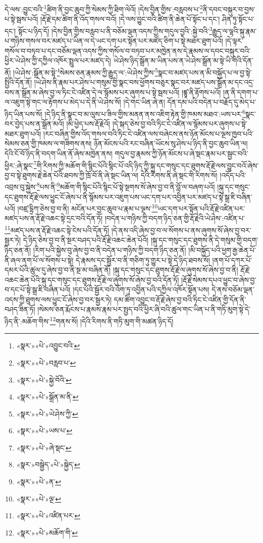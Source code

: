 དེ་ལས་:བྱུང་བའི་\footnote{«སྣར་»«པེ་»འབྱུང་བའི་}ཚིག་ནི་བྱང་ཆུབ་ཀྱི་སེམས་ཀྱི་ཐིག་ལེའོ། །དེས་བྱིན་གྱིས་:བརླབས་པ་\footnote{«སྣར་»«པེ་»བརླབ་པ་}ནི་དབང་བསྐུར་བ་བྱས་པ་སྟེ་སྦས་པའོ། །རྡོ་རྗེ་དམ་ཚིག་ནི་འོད་གསལ་བའོ། །དེ་ལས་བྱུང་བའི་ཚིག་ནི་ཆེན་པོ་སྟོང་པ་དང་། ཤིན་ཏུ་སྟོང་པ་དང་། སྟོང་པ་ཉིད་དོ། །དེས་བྱིན་གྱིས་བརླབ་པ་ནི་བཅོམ་ལྡན་འདས་ཀྱིས་གདུལ་བྱའི་:སྐྱེ་བའི་\footnote{«སྣར་»«པེ་»སྐྱེ་བོའི་}རྒྱུད་ལ་ལྷའི་སྐུ་རྣམ་པ་གཉིས་གསལ་བར་མཛད་པ་ཡིན་ལ་དེ་ཡང་དག་པར་སྟོན་པར་མཛོད་ཅིག་པ་སྟེ་མཐར་ཐུག་པའོ། །དེ་ལྟར་གསོལ་བ་བཏབ་པ་དང་བཅོམ་ལྡན་འདས་ཀྱིས་གསོལ་བ་བཏབ་པར་མཁྱེན་ནས་དེ་རྣམས་ལ་དབང་བསྐུར་བའི་ཕྱིར་ཡེ་ཤེས་ཀྱི་དཀྱིལ་འཁོར་སྤྲུལ་པར་མཛད་དེ། ཡེ་ཤེས་ཉིད་སྒྲོན་མ་ཡིན་པས་ན་ཡེ་ཤེས་སྒྲོན་མ་སྟེ་ཡི་གེའི་དོན་ནོ། །ཡེ་ཤེས་:སྒྲོན་མ་སྟེ་\footnote{«སྣར་»«པེ་»སྒྲོན་མ་ནི་}སེམས་ཅན་རྣམས་ཀྱི་རྒྱུད་ལ་:ཡེ་ཤེས་ཀྱིས་\footnote{«སྣར་»«པེ་»ཡེ་ཤེས་ཀྱི་}སྣང་བ་མཛད་པས་ན་མི་བསྐྱོད་པ་ལ་བྱ་སྟེ་སྤྱིའི་དོན་ནོ། །ཡེ་ཤེས་ནི་རྣམ་པར་ཤེས་པ་གསུམ་གྱི་སྣང་བས་ཕྱོགས་བཅུར་སྣང་བར་མཛད་པས་སྒྲོན་མ་དང་འདྲ་བས་ན་སྒྲོན་མ་ཞེས་བྱ་ལ་ཏིང་ངེ་འཛིན་དེ་ལ་སྙོམས་པར་ཞུགས་པ་སྟེ་སྦས་པའོ། །ཛྙཱ་ནི་རྟོགས་པའོ། །ན་ནི་དགག་པ་ལ་འཇུག་སྟེ་གང་ལ་རྟོགས་པ་མེད་པ་དེ་ནི་ཡེ་ཤེས་སོ། །དེ་གང་ཡིན་ཞེ་ན། དོན་དམ་པའི་བདེན་པ་བརྗོད་དུ་མེད་པ་ཉིད་ཡིན་པས་སོ། །དེ་ཉིད་ནི་སྣང་བ་མ་ལུས་པ་ཟིལ་གྱིས་མནན་ནས་འཇིག་རྟེན་གྱི་ཁམས་མཐའ་:ཡས་པར་\footnote{«སྣར་»«པེ་»ཡས་པ་}སྣང་བར་བྱེད་པས་ན་སྒྲོན་མའོ། །མི་ཕྱེད་པས་རྡོ་རྗེའོ། །དེ་སྐད་ཅེས་བྱ་བའི་ཏིང་ངེ་འཛིན་ལ་སྙོམས་པར་ཞུགས་པ་སྟེ་མཐར་ཐུག་པའོ། །རང་བཞིན་གྱིས་འོད་གསལ་བའི་ཏིང་ངེ་འཛིན་ལས་བཞེངས་ནས་ཉོན་མོངས་པ་ལྔས་ཁྱབ་པའི་སེམས་ཅན་གྱི་ཁམས་ལ་གཟིགས་ནས། ཉོན་མོངས་པའི་རང་བཞིན་ཡོངས་སུ་ཤེས་པ་ཉིད་ནི་བྱང་ཆུབ་ཡིན་ལ། དེའི་ངོ་བོ་ཉིད་ནི་བདག་ཡིན་ནོ་ཞེས་མཁྱེན་ནས། གདུལ་བྱ་རྣམས་ཀྱི་ཉོན་མོངས་པ་ཞེ་སྡང་རྣམ་པར་སྦྱང་བའི་ཕྱིར་:ཞེ་སྣང་\footnote{«སྣར་»«པེ་»ཞེ་སྡང་}གི་རིགས་ཀྱི་མཆོག་གི་སྙིང་པོའི་སྙིང་པོ་འདི་ཉིད་ཀྱི་སྐུ་དང་གསུང་དང་ཐུགས་རྡོ་རྗེ་ལས་བྱུང་བའོ་ཞེས་བྱ་བ་སྟེ་ཐུགས་རྗེ་ཆེན་པོའི་ཐབས་ཀྱི་ཁྲོ་བོ་ནི་ཞེ་སྡང་ཡིན་ལ། དེའི་རིགས་ནི་ཞེ་སྡང་གི་རིགས་སོ། །འདོད་པའི་འབྲས་བུ་སྐྱེས་\footnote{«སྣར་»བསྒྱེད་«པེ་»སྐྱེད་}པས་ནི་\footnote{«སྣར་»«པེ་»ན་}མཆོག་གི་སྙིང་པོའི་སྙིང་པོ་སྟེ་སྔགས་སོ་ཞེས་བྱ་བ་ནི་བློ་ལ་བཞག་པའོ། །སྐུ་དང་གསུང་དང་ཐུགས་རྡོ་རྗེ་ལས་ཕྱུང་ངོ་ཞེས་པ་ནི་སྙོམས་པར་འཇུག་པས་ཡང་དག་པར་འབྱིན་པར་མཛད་པ་སྟེ་སྒྲ་ཇི་བཞིན་པའོ། །བཛྲ་དྷྲིཀ་ཅེས་བྱ་བ་ནི། མངོན་པར་བྱང་ཆུབ་པ་རྣམ་པ་ལྔས་\footnote{«སྣར་»«པེ་»ལྔ་}ཡང་དག་པར་སྟོན་པའི་རྡོ་རྗེ་འཛིན་པར་མཛད་པས་ན་རྡོ་རྗེ་འཆང་སྟེ་དྲང་བའི་དོན་ཏོ། །བདེན་པ་གཉིས་ཀྱི་བདག་ཉིད་ཅན་གྱི་རྡོ་རྗེའི་ཡེ་ཤེས་:འཛིན་པ་\footnote{«སྣར་»«པེ་»འཛིན་པར་}མཛད་པས་ན་རྡོ་རྗེ་འཆང་སྟེ་ངེས་པའི་དོན་ཏོ། །དེ་ནས་འདི་ཞེས་བྱ་བ་ལ་སོགས་པ་ནས་ཞུགས་སོ་ཞེས་བྱ་བར་སྦྱར་ཏེ། དེ་ཉིད་ཅེས་བྱ་བ་ནི་སྔར་བཤད་པའི་རྡོ་རྗེ་འཆང་ཆེན་པོའོ། །སྐུ་དང་གསུང་དང་ཐུགས་ནི་དེ་གསུམ་གྱི་བདག་ཉིད་ཅན་ནོ། །རིག་པའི་སྐྱེས་བུ་ཞེས་བྱ་བ་ནི་བདེན་པ་གཉིས་ཀྱི་བདག་ཉིད་ཅན་ནོ། །མི་བསྐྱོད་པའི་ཕྱག་རྒྱ་ཆེན་པོ་ནི་ཞལ་ནག་པོ་ལ་སོགས་པ་སྟེ། དེ་རྣམས་དང་སྦྱོར་བ་ནི་གཅིག་ཏུ་གྱུར་པ་སྟེ་དེ་ཉིད་ཐབས་སོ། །ནག་པོ་དཀར་པོ་དམར་པོའི་ཚུལ་དུ་ཞེས་བྱ་བ་ནི་སྔ་མ་བཞིན་ནོ། །སྐུ་དང་གསུང་དང་ཐུགས་རྡོ་རྗེ་ལ་ཞུགས་སོ་ཞེས་བྱ་བ་ནི། རྡོ་རྗེ་འཆང་ཆེན་པོའི་སྐུ་དང་གསུང་དང་ཐུགས་རྡོ་རྗེ་ལ་ཞུགས་སོ་ཞེས་བྱ་བའི་དོན་ཏོ། །རྡོ་རྗེ་སེམས་དཔའ་ཕྱུང་བ་ཞེས་བྱ་བ་དང་པོ་སྟེ་སྒྲ་ཇི་བཞིན་པའོ། །དང་པོའི་སྦྱོར་བའི་འོག་ཏུ་འབྱིན་པའི་དཀྱིལ་འཁོར་སྟོན་པས། དེ་ནས་བཅོམ་ལྡན་འདས་ཀྱི་ཐུགས་ལས་ཕྱུང་ངོ་ཞེས་བྱ་བར་སྦྱར་ཏེ། དམ་ཚིག་འབྱུང་བ་རྡོ་རྗེ་ཞེས་བྱ་བའི་ཏིང་ངེ་འཛིན་གྱི་དོན་ནི་བཤད་ཟིན་ཏོ། །སེམས་ཅན་རྨོངས་པ་རྣམས་རྣམ་པར་སྤྱད་བའི་ཕྱིར་ཞི་བའི་ཚུལ་གང་ཡིན་པ་ནི་གཏི་མུག་སྟེ་དེ་ཉིད་ནི་:མཆོག་གིས་\footnote{«སྣར་»«པེ་»མཆོག་གི་}གནས་སོ། །དེའི་རིགས་ནི་གཏི་མུག་གི་མཚན་ཉིད་དོ། 